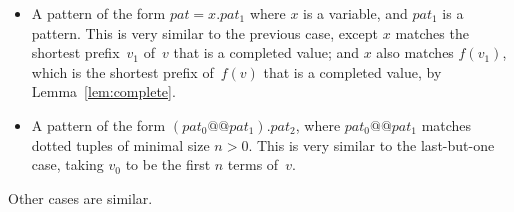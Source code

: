 \begin{itemize}
\item A pattern of the form $pat = x.pat_1$ where $x$ is a variable, and
  $pat_1$ is a pattern.  This is very similar to the previous case, except $x$
  matches the shortest prefix~$v_1$ of~$v$ that is a completed value; and $x$
  also matches $f(v_1)$, which is the shortest prefix of~$f(v)$ that is a
  completed value, by Lemma~\ref{lem:complete}.

\item A pattern of the form $(pat_0 @@ pat_1).pat_2$, where $pat_0 @@ pat_1$
  matches dotted tuples of minimal size $n>0$.  This is very similar to the
  last-but-one case, taking $v_0$ to be the first $n$ terms of~$v$.
\end{itemize}
Other cases are similar.
